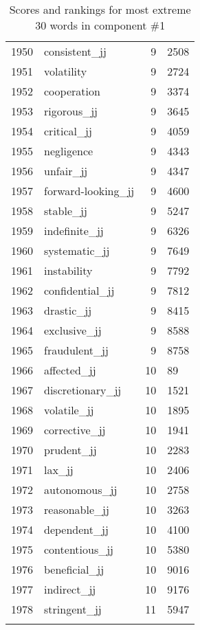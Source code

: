 \begin{longtable}[!htbp]{| rlr@{.}l |}
    1950 & consistent\_jj & 9 & 2508 \\
    1951 & volatility & 9 & 2724 \\
    1952 & cooperation & 9 & 3374 \\
    1953 & rigorous\_jj & 9 & 3645 \\
    1954 & critical\_jj & 9 & 4059 \\
    1955 & negligence & 9 & 4343 \\
    1956 & unfair\_jj & 9 & 4347 \\
    1957 & forward-looking\_jj & 9 & 4600 \\
    1958 & stable\_jj & 9 & 5247 \\
    1959 & indefinite\_jj & 9 & 6326 \\
    1960 & systematic\_jj & 9 & 7649 \\
    1961 & instability & 9 & 7792 \\
    1962 & confidential\_jj & 9 & 7812 \\
    1963 & drastic\_jj & 9 & 8415 \\
    1964 & exclusive\_jj & 9 & 8588 \\
    1965 & fraudulent\_jj & 9 & 8758 \\
    1966 & affected\_jj & 10 & 89 \\
    1967 & discretionary\_jj & 10 & 1521 \\
    1968 & volatile\_jj & 10 & 1895 \\
    1969 & corrective\_jj & 10 & 1941 \\
    1970 & prudent\_jj & 10 & 2283 \\
    1971 & lax\_jj & 10 & 2406 \\
    1972 & autonomous\_jj & 10 & 2758 \\
    1973 & reasonable\_jj & 10 & 3263 \\
    1974 & dependent\_jj & 10 & 4100 \\
    1975 & contentious\_jj & 10 & 5380 \\
    1976 & beneficial\_jj & 10 & 9016 \\
    1977 & indirect\_jj & 10 & 9176 \\
    1978 & stringent\_jj & 11 & 5947 \\
    \hline
    \caption{Scores and rankings for most extreme 30 words in component \#1} \\
\end{longtable}
